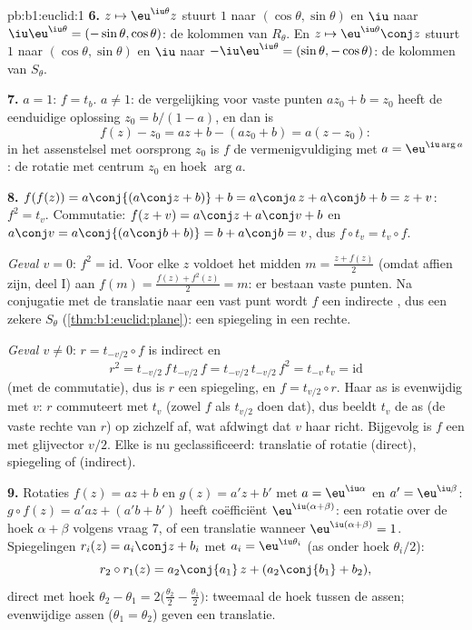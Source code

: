 \begin{solution}{pb:b1:euclid:1}
\textbf{6.} $z \mapsto \eu^{\iu\theta}z$ stuurt $1$ naar
$(\cos\theta, \sin\theta)$ en $\iu$ naar $\iu\eu^{\iu\theta} =
(-\sin\theta, \cos\theta)$: de kolommen van $R_\theta$. En $z
\mapsto \eu^{\iu\theta}\conj z$ stuurt $1$ naar $(\cos\theta,
\sin\theta)$ en $\iu$ naar $-\iu\eu^{\iu\theta} = (\sin\theta,
-\cos\theta)$: de kolommen van $S_\theta$.

\textbf{7.} $a = 1$: $f = t_b$. $a \neq 1$: de vergelijking voor
vaste punten $az_0 + b = z_0$ heeft de eenduidige oplossing $z_0 =
b/(1 - a)$, en dan is
\[
f(z) - z_0 = az + b - (az_0 + b) = a(z - z_0):
\]
in het assenstelsel met oorsprong $z_0$ is $f$ de
vermenigvuldiging met $a = \eu^{\iu\arg a}$: de rotatie met
centrum $z_0$ en hoek $\arg a$.

\textbf{8.} $f(f(z)) = a\conj{(a\conj z + b)} + b = a\conj a\,z +
a\conj b + b = z + v$: $f^2 = t_v$. Commutatie: $f(z + v) = a\conj
z + a\conj v + b$ en $a\conj v = a\conj{(a\conj b + b)} = b +
a\conj b = v$, dus $f\circ t_v = t_v\circ f$.

\emph{Geval $v = 0$}: $f^2 = \mathrm{id}$. Voor elke $z$ voldoet
het midden $m = \frac{z + f(z)}2$ (omdat  affien zijn,
deel I) aan $f(m) = \frac{f(z) + f^2(z)}{2} = m$: er bestaan vaste
punten. Na conjugatie met de translatie naar een vast punt wordt
$f$ een  indirecte , dus een zekere $S_\theta$
(\cref{thm:b1:euclid:plane}): een spiegeling in een rechte.

\emph{Geval $v \neq 0$}: $r = t_{-v/2}\circ f$ is indirect en
\[
r^2 = t_{-v/2}\,f\,t_{-v/2}\,f = t_{-v/2}\,t_{-v/2}\,f^2
= t_{-v}\,t_v = \mathrm{id}
\]
(met de commutatie), dus is $r$ een spiegeling, en $f =
t_{v/2}\circ r$. Haar as is evenwijdig met $v$: $r$ commuteert met
$t_v$ (zowel $f$ als $t_{v/2}$ doen dat), dus beeldt $t_v$ de as
(de vaste rechte van $r$) op zichzelf af, wat afdwingt dat $v$ haar
richt. Bijgevolg is $f$ een  met glijvector $v/2$.
Elke  is nu geclassificeerd: translatie of rotatie
(direct), spiegeling of  (indirect).

\textbf{9.} Rotaties $f(z) = az + b$ en $g(z) = a'z + b'$ met $a =
\eu^{\iu\alpha}$ en $a' = \eu^{\iu\beta}$: $g\circ f(z) = a'az +
(a'b + b')$ heeft  coëfficiënt $\eu^{\iu(\alpha+\beta)}$:
een rotatie over de hoek $\alpha + \beta$ volgens vraag 7, of een
translatie wanneer $\eu^{\iu(\alpha+\beta)} = 1$. Spiegelingen
$r_i(z) = a_i\conj z + b_i$ met $a_i = \eu^{\iu\theta_i}$ (as onder
hoek $\theta_i/2$):
\[
r_2\circ r_1(z) = a_2\conj{a_1}\,z + (a_2\conj{b_1} + b_2),
\]
direct met hoek $\theta_2 - \theta_1 = 2\bigl(\tfrac{\theta_2}2 -
\tfrac{\theta_1}2\bigr)$: tweemaal de hoek tussen de assen;
evenwijdige assen ($\theta_1 = \theta_2$) geven een translatie.


\end{solution}
